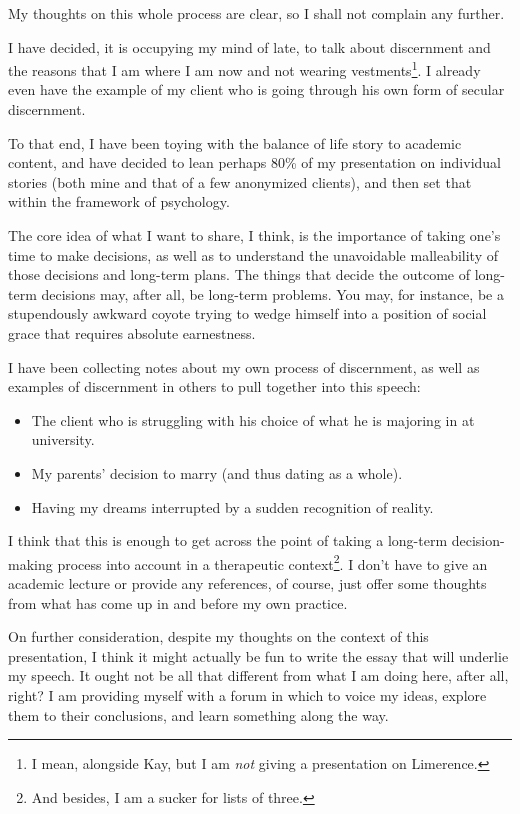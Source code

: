 My thoughts on this whole process are clear, so I shall not complain any further.

I have decided, it is occupying my mind of late, to talk about discernment and the reasons that I am where I am now and not wearing vestments\footnote{I mean, alongside Kay, but I am \emph{not} giving a presentation on Limerence.}. I already even have the example of my client who is going through his own form of secular discernment.

To that end, I have been toying with the balance of life story to academic content, and have decided to lean perhaps 80\% of my presentation on individual stories (both mine and that of a few anonymized clients), and then set that within the framework of psychology.

The core idea of what I want to share, I think, is the importance of taking one's time to make decisions, as well as to understand the unavoidable malleability of those decisions and long-term plans. The things that decide the outcome of long-term decisions may, after all, be long-term problems. You may, for instance, be a stupendously awkward coyote trying to wedge himself into a position of social grace that requires absolute earnestness.

I have been collecting notes about my own process of discernment, as well as examples of discernment in others to pull together into this speech:

\begin{itemize}
\tightlist
\item
  The client who is struggling with his choice of what he is majoring in at university.
\item
  My parents' decision to marry (and thus dating as a whole).
\item
  Having my dreams interrupted by a sudden recognition of reality.
\end{itemize}

I think that this is enough to get across the point of taking a long-term decision-making process into account in a therapeutic context\footnote{And besides, I am a sucker for lists of three.}. I don't have to give an academic lecture or provide any references, of course, just offer some thoughts from what has come up in and before my own practice.

On further consideration, despite my thoughts on the context of this presentation, I think it might actually be fun to write the essay that will underlie my speech. It ought not be all that different from what I am doing here, after all, right? I am providing myself with a forum in which to voice my ideas, explore them to their conclusions, and learn something along the way.

